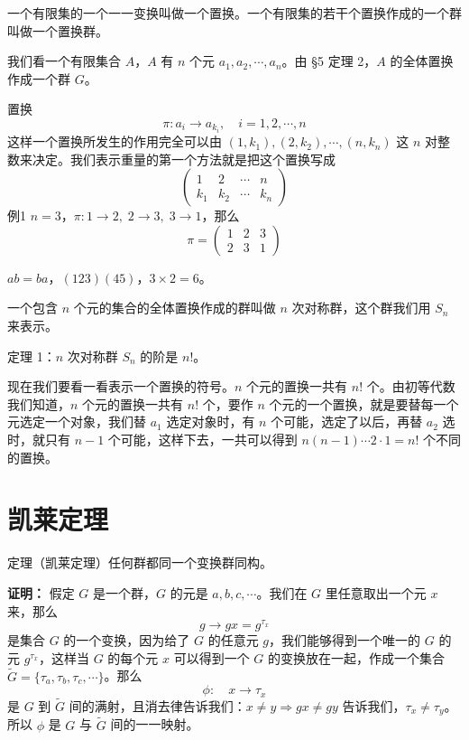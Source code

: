 \begin{definition}[置换与置换群]
一个有限集的一个一一变换叫做一个置换。一个有限集的若干个置换作成的一个群叫做一个置换群。

我们看一个有限集合 $A$，$A$ 有 $n$ 个元 $a_1,a_2,\cdots,a_n$。由 §5 定理 2，$A$ 的全体置换作成一个群 $G$。
\end{definition}

\begin{definition}[置换的书写方式]
置换
\[
\pi:a_i\longrightarrow a_{k_i},\quad i=1,2,\cdots,n
\]
这样一个置换所发生的作用完全可以由 $(1,k_1),(2,k_2),\cdots,(n,k_n)$ 这 $n$ 对整数来决定。我们表示重量的第一个方法就是把这个置换写成
\[
\begin{pmatrix}1&2&\cdots&n\\k_1&k_2&\cdots&k_n\end{pmatrix}
\]
例1 $n=3$，$\pi:1\to2,\;2\to3,\;3\to1$，那么
\[
\pi=\begin{pmatrix}1&2&3\\2&3&1\end{pmatrix}
\]
\end{definition}

\begin{note}[只要不相连就可以快速求阶数而且有交换律]
$ab=ba$，$(123)(45)$，$3\times2=6$。
\end{note}

\begin{definition}[对称群]
一个包含 $n$ 个元的集合的全体置换作成的群叫做 $n$ 次对称群，这个群我们用 $S_n$ 来表示。
\end{definition}

\begin{theorem}
定理 1：$n$ 次对称群 $S_n$ 的阶是 $n!$。

现在我们要看一看表示一个置换的符号。$n$ 个元的置换一共有 $n!$ 个。由初等代数我们知道，$n$ 个元的置换一共有 $n!$ 个，要作 $n$ 个元的一个置换，就是要替每一个元选定一个对象，我们替 $a_1$ 选定对象时，有 $n$ 个可能，选定了以后，再替 $a_2$ 选时，就只有 $n-1$ 个可能，这样下去，一共可以得到 $n(n-1)\cdots2\cdot1=n!$ 个不同的置换。
\end{theorem}

\section{凯莱定理}

\begin{theorem}
定理（凯莱定理）任何群都同一个变换群同构。

\textbf{证明：} 假定 $G$ 是一个群，$G$ 的元是 $a,b,c,\cdots$。我们在 $G$ 里任意取出一个元 $x$ 来，那么
\[
g\longrightarrow gx=g^{\tau_x}
\]
是集合 $G$ 的一个变换，因为给了 $G$ 的任意元 $g$，我们能够得到一个唯一的 $G$ 的元 $g^{\tau_x}$，这样当 $G$ 的每个元 $x$ 可以得到一个 $G$ 的变换放在一起，作成一个集合 $\tilde{G}=\{\tau_a,\tau_b,\tau_c,\cdots\}$。那么
\[
\phi:\quad x\longrightarrow\tau_x
\]
是 $G$ 到 $\tilde{G}$ 间的满射，且消去律告诉我们：$x\ne y\Rightarrow gx\ne gy$ 告诉我们，$\tau_x\ne\tau_y$。所以 $\phi$ 是 $G$ 与 $\tilde{G}$ 间的一一映射。
\end{theorem}


